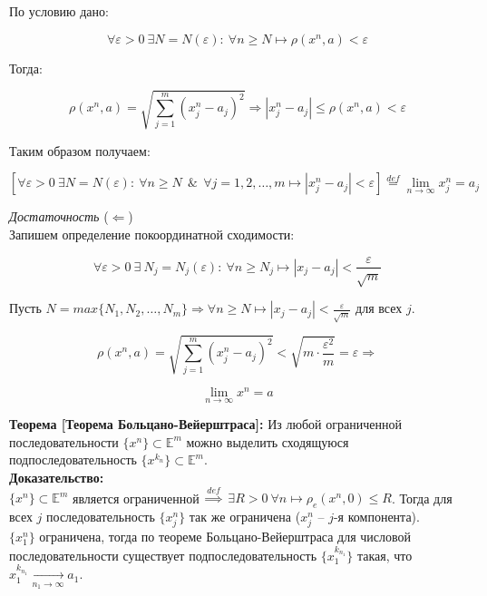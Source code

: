 \documentclass[a4paper,12pt]{article} %
\begin{document}
\noindent По условию дано:

\[ \forall \varepsilon > 0 ~ \exists N = N(\varepsilon) : ~ \forall n \geqslant N \mapsto \rho(x^n, a) < \varepsilon \]

\noindent Тогда:

\[ \rho(x^n, a) = \sqrt{\sum_{j = 1}^m (x_j^n - a_j)^2} \Rightarrow |x_j^n - a_j| \leqslant \rho(x^n, a) < \varepsilon \]

\noindent Таким образом получаем:

\[ [\forall \varepsilon > 0 ~ \exists N = N(\varepsilon) : ~ \forall n \geqslant N ~~ \& ~~ \forall j = 1, 2, \dots, m \mapsto |x_j^n - a_j| < \varepsilon] \stackrel{def}{=} \lim_{n \to \infty} x_j^n = a_j \]

\noindent \textit{Достаточность} ($\Leftarrow$)\\

\noindent Запишем определение покоординатной сходимости:

\[ \forall \varepsilon > 0 ~ \exists ~ N_j = N_j(\varepsilon) : ~ \forall n \geqslant N_j \mapsto |x_j - a_j| < \frac{\varepsilon}{\sqrt{m}} \]

\noindent Пусть $N = max\{N_1, N_2, \dots, N_m \} \Rightarrow \forall n \geqslant N \mapsto |x_j - a_j| < \frac{\varepsilon}{\sqrt{m}}$ для всех $j$.

\[ \rho(x^n, a) = \sqrt{\sum_{j = 1}^m (x_j^n - a_j)^2} < \sqrt{m \cdot \frac{\varepsilon^2}{m}} = \varepsilon \Rightarrow \]

\[ \lim_{n \to \infty} x^n = a \]

\noindent \textbf{Теорема [Теорема Больцано-Вейерштраса]:} Из любой ограниченной последовательности $\{x^n \} \subset \mathbb{E}^m$ можно выделить сходящуюся подпоследовательность $\{x^{k_n} \} \subset \mathbb{E}^m$.\\

\noindent \textbf{Доказательство:}\\
$\{x^n \} \subset \mathbb{E}^m$ является ограниченной $\stackrel{def}{\Rightarrow}$ $\exists R > 0 ~ \forall n \mapsto \rho_e(x^n, 0) \leqslant R$. Тогда для всех $j$ последовательность $\{x_j^n \}$ так же ограничена ($x_j^n$ -- $j$-я компонента).\\

\noindent $\{x_1^n \}$ ограничена, тогда по теореме Больцано-Вейерштраса для числовой последовательности существует подпоследовательность $\{x_1^{k_{n_1}} \}$ такая, что $x_1^{k_{n_1}} \xrightarrow[n_1 \to \infty]{} a_1$.\\
\end{document}
